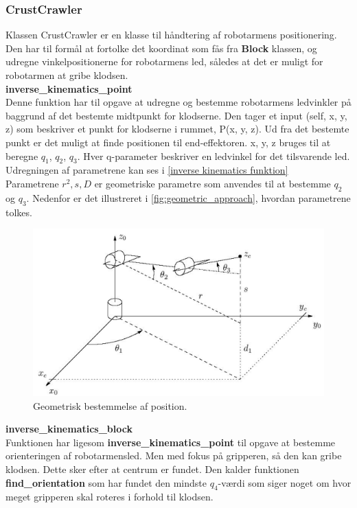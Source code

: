 \subsubsection{CrustCrawler}
\label{subsub: CrustCrawler}

Klassen CrustCrawler er en klasse til håndtering af robotarmens positionering. Den har til formål at fortolke det koordinat som fås fra \textbf{Block} klassen, og udregne vinkelpositionerne for robotarmens led, således at det er muligt for robotarmen at gribe klodsen.\\

\textbf{inverse\_kinematics\_point}\\
Denne funktion har til opgave at udregne og bestemme robotarmens ledvinkler på baggrund af det bestemte midtpunkt for klodserne. Den tager et input (self, x, y, z) som beskriver et punkt for klodserne i rummet, P(x, y, z). Ud fra det bestemte punkt er det muligt at finde positionen til end-effektoren. x, y, z bruges til at beregne $q_1$, $q_2$, $q_3$. Hver q-parameter beskriver en ledvinkel for det tilsvarende led. Udregningen af parametrene kan ses i \autoref{inverse kinematics funktion}\\

Parametrene $r^2, s, D$ er geometriske parametre som anvendes til at bestemme $q_2$ og $q_3$. Nedenfor er det illustreret i \autoref{fig:geometric_approach}, hvordan parametrene tolkes.\\

\begin{figure}[h]
\centering
\includegraphics[scale=0.4]{images/geometric_approach}
\caption{Geometrisk bestemmelse af position.}
\label{fig:geometric_approach}
\end{figure}

\newpage
\textbf{inverse\_kinematics\_block}\\
Funktionen har ligesom \textbf{inverse\_kinematics\_point} til opgave at bestemme orienteringen af robotarmensled. Men med fokus på gripperen, så den kan gribe klodsen. Dette sker efter at centrum er fundet. Den kalder funktionen \textbf{find\_orientation} som har fundet den mindste $q_4$-værdi som siger noget om hvor meget gripperen skal roteres i forhold til klodsen.

